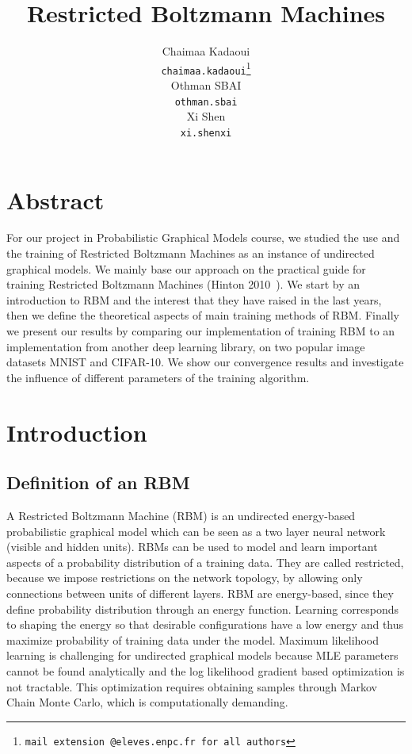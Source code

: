 \documentclass{article}
\title{Restricted Boltzmann Machines}
\author{
  Chaimaa Kadaoui  \\
  \texttt{chaimaa.kadaoui\thanks{mail extension @eleves.enpc.fr for all authors}} \\
  \And
  Othman SBAI \\
  \texttt{othman.sbai} \\
  \And
   Xi Shen\\
  \texttt{xi.shenxi} \\
}
\begin{document}
\maketitle
\section{Abstract}
For our project in Probabilistic Graphical Models course, we studied the use and the training of Restricted Boltzmann Machines as an instance of undirected graphical models. We mainly base our approach on the practical guide for training Restricted Boltzmann Machines (Hinton 2010~\cite{hinton2010practical}). We start by an introduction to RBM and the interest that they have raised in the last years, then we define the theoretical aspects of main training methods of RBM. Finally we present our results by comparing our implementation of training RBM to an implementation from another deep learning library, on two popular image datasets MNIST and CIFAR-10. We show our convergence results and investigate the influence of different parameters of the training algorithm.



\section{Introduction}
\subsection{Definition of an RBM}

A Restricted Boltzmann Machine (RBM) is an undirected energy-based probabilistic graphical model which can be seen as a two layer neural network (visible and hidden units). RBMs can be used to model and learn important aspects of a probability distribution of a training data. They are called restricted, because we impose restrictions on the network topology, by allowing only connections between units of different layers. RBM are energy-based, since they define probability distribution through an energy function. Learning corresponds to shaping the energy so that desirable configurations have a low energy and thus maximize probability of training data under the model. Maximum likelihood learning is challenging for undirected graphical models because MLE parameters cannot be found analytically and the log likelihood gradient based optimization is not tractable. This optimization requires obtaining samples through Markov Chain Monte Carlo, which is computationally demanding.
\end{document}
